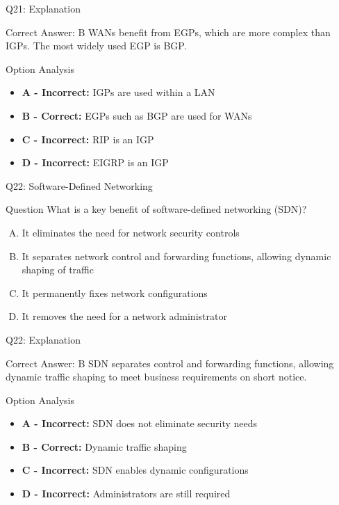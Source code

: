 \documentclass{beamer}
\begin{document}
	\begin{frame}{Q21: Explanation}
		\begin{block}{Correct Answer: B}
			WANs benefit from EGPs, which are more complex than IGPs. The most widely used EGP is BGP.
		\end{block}
		\begin{block}{Option Analysis}
			\begin{itemize}
				\item \textbf{A - Incorrect:} IGPs are used within a LAN
				\item \textbf{B - Correct:} EGPs such as BGP are used for WANs
				\item \textbf{C - Incorrect:} RIP is an IGP
				\item \textbf{D - Incorrect:} EIGRP is an IGP
			\end{itemize}
		\end{block}
	\end{frame}
	
	\begin{frame}{Q22: Software-Defined Networking}
		\begin{block}{Question}
			What is a key benefit of software-defined networking (SDN)?
		\end{block}
		\begin{enumerate}[(A)]
			\item It eliminates the need for network security controls
			\item It separates network control and forwarding functions, allowing dynamic shaping of traffic
			\item It permanently fixes network configurations
			\item It removes the need for a network administrator
		\end{enumerate}
	\end{frame}
	
	\begin{frame}{Q22: Explanation}
		\begin{block}{Correct Answer: B}
			SDN separates control and forwarding functions, allowing dynamic traffic shaping to meet business requirements on short notice.
		\end{block}
		\begin{block}{Option Analysis}
			\begin{itemize}
				\item \textbf{A - Incorrect:} SDN does not eliminate security needs
				\item \textbf{B - Correct:} Dynamic traffic shaping
				\item \textbf{C - Incorrect:} SDN enables dynamic configurations
				\item \textbf{D - Incorrect:} Administrators are still required
			\end{itemize}
		\end{block}
	\end{frame}
	
\end{document}
